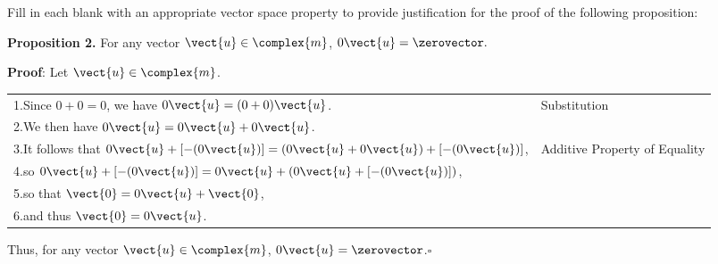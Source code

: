 Fill in each blank with an appropriate vector space property to provide justification for the proof of the following proposition:\par
%
{\bf Proposition 2.} 
For any vector $\vect{u}\in\complex{m}$, $0\vect{u}=\zerovector.$\par
%
{\bf Proof}: Let $\vect{u}\in\complex{m}$.\par
%
\begin{tabular}{ll}
1.\quad Since $0 + 0 = 0$, we have $0\vect{u} = (0 + 0)\vect{u}$.& Substitution\\
2.\quad We then have $0\vect{u} = 0 \vect{u} + 0 \vect{u}$.&\underline{\hspace*{2.0in}}\\
3.\quad It follows that $0\vect{u} + [-(0 \vect{u})] = (0\vect{u} +  0\vect{u}) + [-(0 \vect{u})]$,&Additive Property of Equality\\
4.\quad so $0\vect{u} + [-(0 \vect{u})] = 0\vect{u}+\left(0\vect{u}+[-(0 \vect{u})]\right)$,&\underline{\hspace*{2.0in}}\\
5.\quad so that $\vect{0} = 0\vect{u} + \vect{0}$,&\underline{\hspace*{2.0in}}\\
6.\quad and thus $\vect{0} = 0\vect{u}$.&\underline{\hspace*{2.0in}}\\
\end{tabular}\par
%
Thus, for any vector $\vect{u}\in\complex{m}$,  $0\vect{u}=\zerovector$.\quad$\square$